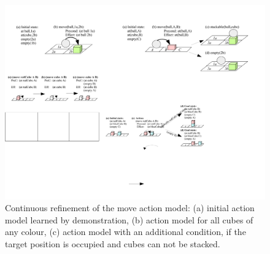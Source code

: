 \begin{figure}[h]
	\centering
	\includegraphics[width=0.8\linewidth]{figures/scenarios-exp2}
	\caption{Continuous refinement of the move action model: (a) initial action model learned by demonstration, (b) action model for all cubes of any colour, (c) action model with an additional condition, if the target position is occupied and cubes can not be stacked.}
	\label{fig:scenarios-exp2}
\end{figure} 
